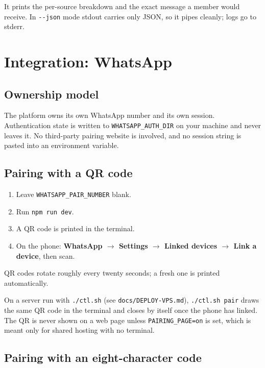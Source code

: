 \documentclass[11pt,a4paper]{report}
\begin{document}
It prints the per-source breakdown and the exact message a member would
receive. In \texttt{-{}-json} mode stdout carries only JSON, so it pipes
cleanly; logs go to stderr.

\chapter{Integration: WhatsApp}

\section{Ownership model}

The platform owns its own WhatsApp number and its own session. Authentication
state is written to \texttt{WHATSAPP\_AUTH\_DIR} on your machine and never
leaves it. No third-party pairing website is involved, and no session string is
pasted into an environment variable.

\section{Pairing with a QR code}

\begin{enumerate}
  \item Leave \texttt{WHATSAPP\_PAIR\_NUMBER} blank.
  \item Run \texttt{npm run dev}.
  \item A QR code is printed in the terminal.
  \item On the phone: \textbf{WhatsApp $\rightarrow$ Settings $\rightarrow$
        Linked devices $\rightarrow$ Link a device}, then scan.
\end{enumerate}

QR codes rotate roughly every twenty seconds; a fresh one is printed
automatically.

On a server run with \texttt{./ctl.sh} (see \texttt{docs/DEPLOY-VPS.md}),
\texttt{./ctl.sh pair} draws the same QR code in the terminal and closes by
itself once the phone has linked. The QR is never shown on a web page unless
\texttt{PAIRING\_PAGE=on} is set, which is meant only for shared hosting with
no terminal.

\section{Pairing with an eight-character code}
\end{document}
